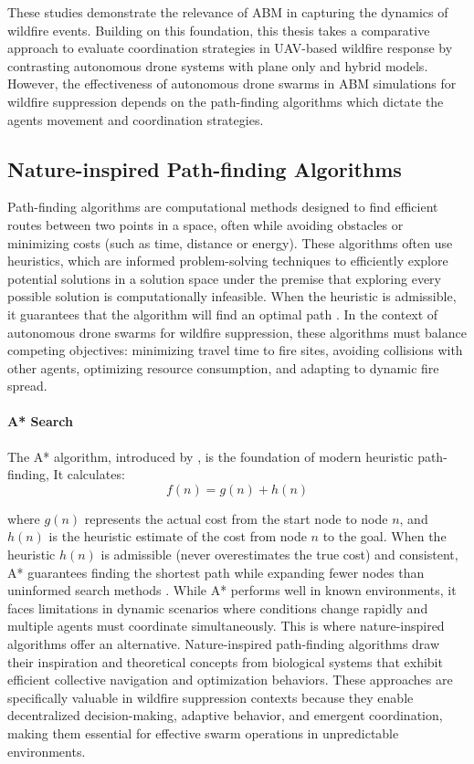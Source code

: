 \documentclass[11pt, a4paper]{article}
\begin{document}
These studies demonstrate the relevance of ABM in capturing the dynamics of wildfire events. Building on this foundation, this thesis takes a comparative approach to evaluate coordination strategies in UAV-based wildfire response by contrasting autonomous drone systems with plane only and hybrid models. However, the effectiveness of autonomous drone swarms in ABM simulations for wildfire suppression depends on the path-finding algorithms which dictate the agents movement and coordination strategies.

\subsection{Nature-inspired Path-finding Algorithms}

Path-finding algorithms are computational methods designed to find efficient routes between two points in a space, often while avoiding obstacles or minimizing costs (such as time, distance or energy). These algorithms often use heuristics, which are informed problem-solving techniques to efficiently explore potential solutions in a solution space under the premise that exploring every possible solution is computationally infeasible. When the heuristic is admissible, it guarantees that the algorithm will find an optimal path \citep{heuristic}.
In the context of autonomous drone swarms for wildfire suppression, these algorithms must balance competing objectives: minimizing travel time to fire sites, avoiding collisions with other agents, optimizing resource consumption, and adapting to dynamic fire spread.

\paragraph{A* Search} The A* algorithm, introduced by \citet*{heuristic}, is the foundation of modern heuristic path-finding, It calculates:
\begin{equation}
  f(n) = g(n) + h(n)
\end{equation}

where $g(n)$ represents the actual cost from the start node to node $n$, and $h(n)$ is the heuristic estimate of the cost from node $n$ to the goal. When the heuristic $h(n)$ is admissible (never overestimates the true cost) and consistent, A* guarantees finding the shortest path while expanding fewer nodes than uninformed search methods \citep{heuristic}. 
While A* performs well in known environments, it faces limitations in dynamic scenarios where conditions change rapidly and multiple agents must coordinate simultaneously. This is where nature-inspired algorithms offer an alternative.
Nature-inspired path-finding algorithms draw their inspiration and theoretical concepts from biological systems that exhibit efficient collective navigation and optimization behaviors. These approaches are specifically valuable in wildfire suppression contexts because they enable decentralized decision-making, adaptive behavior, and emergent coordination, making them essential for effective swarm operations in unpredictable environments.
\end{document}

